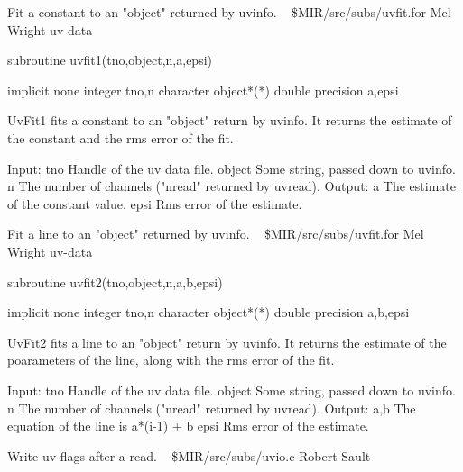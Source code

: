 %
\noindent Fit a constant to an "object" returned by uvinfo.
\newline \ 
\newline {} \$MIR/src/subs/uvfit.for
\newline {} Mel Wright
\newline {} uv-data
\par{\tenpoint
{\eightpoint\begintt
        subroutine uvfit1(tno,object,n,a,epsi)

        implicit none
        integer tno,n
        character object*(*)
        double precision a,epsi

  UvFit1 fits a constant to an "object" return by uvinfo. It
  returns the estimate of the constant and the rms error of the
  fit.

  Input:
    tno        Handle of the uv data file.
    object     Some string, passed down to uvinfo.
    n          The number of channels ("nread" returned by uvread).
  Output:
    a          The estimate of the constant value.
    epsi       Rms error of the estimate.
\endtt}
\par}
%
\noindent Fit a line to an "object" returned by uvinfo.
\newline \ 
\newline {} \$MIR/src/subs/uvfit.for
\newline {} Mel Wright
\newline \abox{Keywords:} uv-data
\par{\tenpoint
{\eightpoint\begintt
        subroutine uvfit2(tno,object,n,a,b,epsi)

        implicit none
        integer tno,n
        character object*(*)
        double precision a,b,epsi

  UvFit2 fits a line to an "object" return by uvinfo. It
  returns the estimate of the poarameters of the line, along with
  the rms error of the fit.

  Input:
    tno        Handle of the uv data file.
    object     Some string, passed down to uvinfo.
    n          The number of channels ("nread" returned by uvread).
  Output:
    a,b        The equation of the line is
                a*(i-1) + b
    epsi       Rms error of the estimate.
\endtt}
\par}
%
\noindent Write uv flags after a read.
\newline \ 
\newline {} \$MIR/src/subs/uvio.c
\newline \abox{Responsible:} Robert Sault
